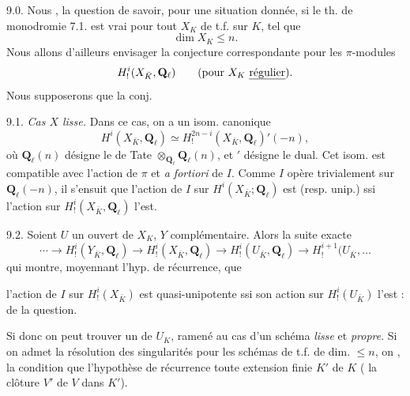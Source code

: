 \documentclass[11pt,a4paper]{article}
\begin{document}
9.0. Nous \ill{} \ill{}, la question de savoir, pour  une situation donnée, si le th. de monodromie 7.1. est vrai pour tout $X_K$ de t.f. sur $K$,  tel que
\[
\dim X_K \leq n .
\]
Nous allons d'ailleurs envisager la conjecture correspondante pour les $\pi$-modules
\[
H^i_!(X_{\bar K}, \mathbf{Q}_\ell) \qquad (\text{pour } X_K \text{ \emph{régulier}}).
\]
Nous supposerons que la conj. \ill{} \ill{}

9.1. \emph{Cas $X$ lisse.}  Dans ce cas, \struck{\ill{}}  on a un isom. canonique
\[
H^i(X_{\bar K}, \mathbf{Q}_\ell) \simeq H^{2n-i}_!(X_{\bar K}, \mathbf{Q}_\ell)'(-n) ,
\]
où $\mathbf{Q}_\ell(n)$ désigne le  de Tate $\otimes_{\mathbf{Q}_\ell} \mathbf{Q}_\ell(n)$, et $'$ désigne le dual. Cet isom. est compatible avec l'action de $\pi$ et \emph{a fortiori} de $I$. Comme $I$ opère trivialement sur $\mathbf{Q}_\ell(-n)$, il s'ensuit que l'action de $I$ sur $H^i(X_{\bar K}; \mathbf{Q}_\ell)$ est  (resp. unip.) ssi \ill{} l'action sur $H^i_!(X_{\bar K}, \mathbf{Q}_\ell)$ l'est.

9.2.    Soient $U$ un ouvert \struck{\ill{}}  de $X_K$, $Y$ \ill{} complémentaire. Alors \ill{} \ill{} la suite exacte
\[
\cdots \to H^i_!(Y_{\bar K}, \mathbf{Q}_\ell) \to H^i_!(X_{\bar K}, \mathbf{Q}_\ell) \to H^i_!(U_{\bar K}, \mathbf{Q}_\ell) \to H^{i+1}_!(U_{\bar K}, \ldots
\]
qui montre, moyennant l'hyp. de récurrence, que

l'action de $I$ sur $H^i_!(X_{\bar K})$ est quasi-unipotente ssi son action sur $H^i_!(U_{\bar K})$ l'est : \ill{} \ill{}  de la question.

Si donc on peut trouver un \struck{\ill{}}  de $U_K$, \ill{} \ill{} ramené au cas d'un schéma \emph{lisse} et \emph{propre}. Si on admet la résolution  des singularités \struck{\ill{}}  pour les schémas de t.f. de dim. $\leq n$, on \ill{}  \ill{},  la condition que l'hypothèse de récurrence \ill{} \ill{} \ill{} toute extension  finie \struck{\ill{}} $K'$ de $K$ (\ill{}  la clôture \ill{} $V'$ de $V$ dans $K'$).
\end{document}

